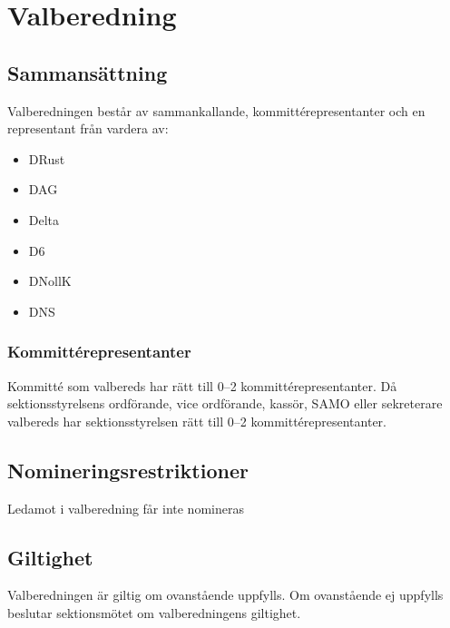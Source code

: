 \section{Valberedning}
\subsection{Sammansättning}
Valberedningen består av sammankallande, kommittérepresentanter och
en representant från vardera av:
\begin{itemize}
  \item DRust
  \item DAG 
  \item Delta 
  \item D6 
  \item DNollK
  \item DNS
\end{itemize}
\subsubsection{Kommittérepresentanter}
Kommitté som valbereds har rätt till 0–2 kommittérepresentanter. Då 
sektionsstyrelsens ordförande, vice ordförande, kassör, SAMO eller 
sekreterare valbereds har sektionsstyrelsen rätt till 0–2 kommittérepresentanter.
\subsection{Nomineringsrestriktioner}
Ledamot i valberedning får inte nomineras
\subsection{Giltighet}
Valberedningen är giltig om ovanstående uppfylls. Om ovanstående ej uppfylls 
beslutar sektionsmötet om valberedningens giltighet.
\newpage